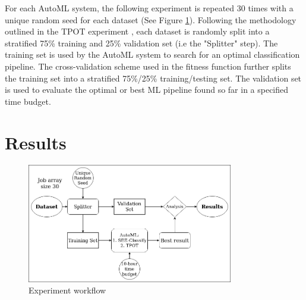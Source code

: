 \documentclass[acmsmall,screen]{acmart}
\begin{document}




For each AutoML system, the following experiment is repeated 30 times with a unique random seed for each dataset (See Figure \ref{fig:experimen_workflow}). Following the methodology outlined in the TPOT experiment \cite{le2020scaling}, each dataset is randomly split into a stratified 75\% training and 25\% validation set (i.e the "Splitter" step). The training set is used by the AutoML system to search for an optimal classification pipeline. The cross-validation scheme used in the fitness function further splits the training set into a stratified 75\%/25\% training/testing set. The validation set is used to evaluate the optimal or best ML pipeline found so far in a specified time budget.

\section{Results}
\begin{figure}[h]
  \centering
  \includegraphics[width=9cm]{flowcharts/experiment_flow_horizontal.png}
  \caption{Experiment workflow}
  \label{fig:experimen_workflow}
\end{figure}
\end{document}
